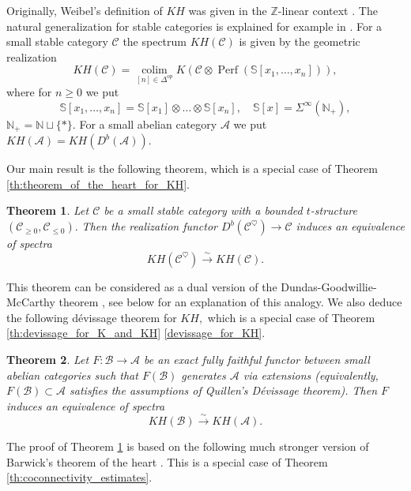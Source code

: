 \documentclass[11pt,leqno]{amsart}
\newtheorem{theo}{Theorem}[section]
\numberwithin{equation}{section}
\def\N{\mathbb{N}}
\def\bS{\mathbb{S}}
\def\Z{\mathbb{Z}}
\DeclareMathOperator*{\colim}{colim}
\newcommand{\xto}{\xrightarrow}
\newcommand{\cA}{{\mathcal A}}
\newcommand{\cB}{{\mathcal B}}
\newcommand{\cC}{{\mathcal C}}
\newcommand{\Perf}{\operatorname{Perf}}
\begin{document}
Originally, Weibel's definition of $KH$ was given in the $\Z$-linear context \cite{Wei89, Wei13, Tab15}. The natural generalization for stable categories is explained for example in \cite[Section 8, Corollary 8.3]{E25c}. For a small stable category $\cC$ the spectrum $KH(\cC)$ is given by the geometric realization \begin{equation}\label{eq:definition_of_KH_intro}
KH(\cC)=\colim\limits_{[n]\in\Delta^{op}} K(\cC\otimes\Perf(\bS[x_1,\dots,x_n])),
\end{equation}
where for $n\geq 0$ we put
\begin{equation*}
\bS[x_1,\dots,x_n]=\bS[x_1]\otimes\dots\otimes\bS[x_n],\quad \bS[x]=\Sigma^{\infty}(\N_+),
\end{equation*}
$\N_+=\N\sqcup\{\ast\}.$ For a small abelian category $\cA$ we put $KH(\cA)=KH(D^b(\cA)).$

Our main result is the following theorem, which is a special case of Theorem \ref{th:theorem_of_the_heart_for_KH}.

\begin{theo}\label{th:theorem_of_the_heart_for_KH_intro}
Let $\cC$ be a small stable category with a bounded $t$-structure $(\cC_{\geq 0},\cC_{\leq 0}).$ Then the realization functor $D^b(\cC^{\heartsuit})\to \cC$ induces an equivalence of spectra 
\begin{equation*}
KH(\cC^{\heartsuit})\xto{\sim}KH(\cC).
\end{equation*}
\end{theo}

This theorem can be considered as a dual version of the Dundas-Goodwillie-McCarthy theorem \cite[Theorem 7.0.0.2]{DGM13}, see below for an explanation of this analogy. We also deduce the following d\'evissage theorem for $KH,$ which is a special case of Theorem \ref{th:devissage_for_K_and_KH} \ref{devissage_for_KH}.

\begin{theo}\label{th:devissage_for_KH_intro}
Let $F:\cB\to\cA$ be an exact fully faithful functor between small abelian categories such that $F(\cB)$ generates $\cA$ via extensions (equivalently, $F(\cB)\subset\cA$ satisfies the assumptions of Quillen's D\'evissage theorem). Then $F$ induces an equivalence of spectra
\begin{equation*}
KH(\cB)\xto{\sim}KH(\cA).
\end{equation*}
\end{theo}

The proof of Theorem \ref{th:theorem_of_the_heart_for_KH_intro} is based on the following much stronger version of Barwick's theorem of the heart \cite[Theorem 6.1]{Bar15}. This is a special case of Theorem \ref{th:coconnectivity_estimates}.
\end{document}

